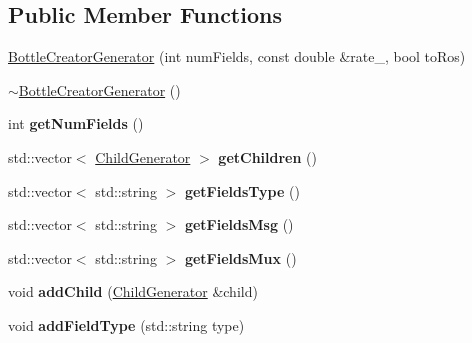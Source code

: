 \subsection*{Public Member Functions}
\begin{DoxyCompactItemize}
\item 
\hyperlink{classBottleCreatorGenerator_a3466bff850a08d9cc93eb8b06ae945d8}{Bottle\-Creator\-Generator} (int num\-Fields, const double \&rate\-\_\-, bool to\-Ros)
\item 
\hyperlink{classBottleCreatorGenerator_a257c47964cfc58ffa7d5fcd44ae1aba4}{$\sim$\-Bottle\-Creator\-Generator} ()
\item 
\hypertarget{classBottleCreatorGenerator_a34be855391145c00dd7f3a2bb41abda5}{int {\bfseries get\-Num\-Fields} ()}\label{classBottleCreatorGenerator_a34be855391145c00dd7f3a2bb41abda5}

\item 
\hypertarget{classBottleCreatorGenerator_a93ddde67ac5b011f15d445ba6f8a84f7}{std\-::vector$<$ \hyperlink{classChildGenerator}{Child\-Generator} $>$ {\bfseries get\-Children} ()}\label{classBottleCreatorGenerator_a93ddde67ac5b011f15d445ba6f8a84f7}

\item 
\hypertarget{classBottleCreatorGenerator_af7d7eea7711f8511ddae33a51dd8b937}{std\-::vector$<$ std\-::string $>$ {\bfseries get\-Fields\-Type} ()}\label{classBottleCreatorGenerator_af7d7eea7711f8511ddae33a51dd8b937}

\item 
\hypertarget{classBottleCreatorGenerator_aa034b1338c9f0b3346e52e5bce4156ee}{std\-::vector$<$ std\-::string $>$ {\bfseries get\-Fields\-Msg} ()}\label{classBottleCreatorGenerator_aa034b1338c9f0b3346e52e5bce4156ee}

\item 
\hypertarget{classBottleCreatorGenerator_ab71bdfa8a3fa42e88453f40e82f53d4b}{std\-::vector$<$ std\-::string $>$ {\bfseries get\-Fields\-Mux} ()}\label{classBottleCreatorGenerator_ab71bdfa8a3fa42e88453f40e82f53d4b}

\item 
\hypertarget{classBottleCreatorGenerator_a57eef736e9ce07393c22f6face03b0e0}{void {\bfseries add\-Child} (\hyperlink{classChildGenerator}{Child\-Generator} \&child)}\label{classBottleCreatorGenerator_a57eef736e9ce07393c22f6face03b0e0}

\item 
\hypertarget{classBottleCreatorGenerator_ae26464fccf513247ec7b4ef1c015936d}{void {\bfseries add\-Field\-Type} (std\-::string type)}\label{classBottleCreatorGenerator_ae26464fccf513247ec7b4ef1c015936d}


\end{DoxyCompactItemize}
